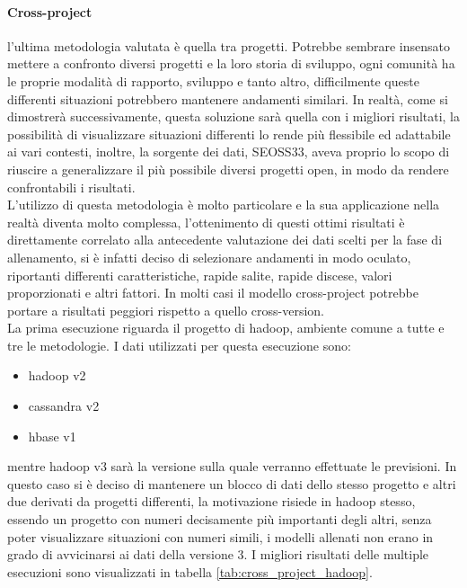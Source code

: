 \documentclass[%
    corpo=12pt,
    twoside,
    oldstyle,
    autoretitolo,
    greek,
    evenboxes,
]{toptesi}
\begin{document}
\paragraph{Cross-project} l'ultima metodologia valutata è quella tra progetti. Potrebbe sembrare insensato mettere a confronto diversi progetti e la loro storia di sviluppo, ogni comunità ha le proprie modalità di rapporto, sviluppo e tanto altro, difficilmente queste differenti situazioni potrebbero mantenere andamenti similari. In realtà, come si dimostrerà successivamente, questa soluzione sarà quella con i migliori risultati, la possibilità di visualizzare situazioni differenti lo rende più flessibile ed adattabile ai vari contesti, inoltre, la sorgente dei dati, SEOSS33, aveva proprio lo scopo di riuscire a generalizzare il più possibile diversi progetti open, in modo da rendere confrontabili i risultati.\\
L'utilizzo di questa metodologia è molto particolare e la sua applicazione nella realtà diventa molto complessa, l'ottenimento di questi ottimi risultati è direttamente correlato alla antecedente valutazione dei dati scelti per la fase di allenamento, si è infatti deciso di selezionare andamenti in modo oculato, riportanti differenti caratteristiche, rapide salite, rapide discese, valori proporzionati e altri fattori. In molti casi il modello cross-project potrebbe portare a risultati peggiori rispetto a quello cross-version.\\
La prima esecuzione riguarda il progetto di hadoop, ambiente comune a tutte e tre le metodologie. I dati utilizzati per questa esecuzione sono:
\begin{itemize}
  \item hadoop v2
  \item cassandra v2
  \item hbase v1
\end{itemize}
mentre hadoop v3 sarà la versione sulla quale verranno effettuate le previsioni. In questo caso si è deciso di mantenere un blocco di dati dello stesso progetto e altri due derivati da progetti differenti, la motivazione risiede in hadoop stesso, essendo un progetto con numeri decisamente più importanti degli altri, senza poter visualizzare situazioni con numeri simili, i modelli allenati non erano in grado di avvicinarsi ai dati della versione 3. I migliori risultati delle multiple esecuzioni sono visualizzati in tabella \ref{tab:cross_project_hadoop}.
\end{document}
